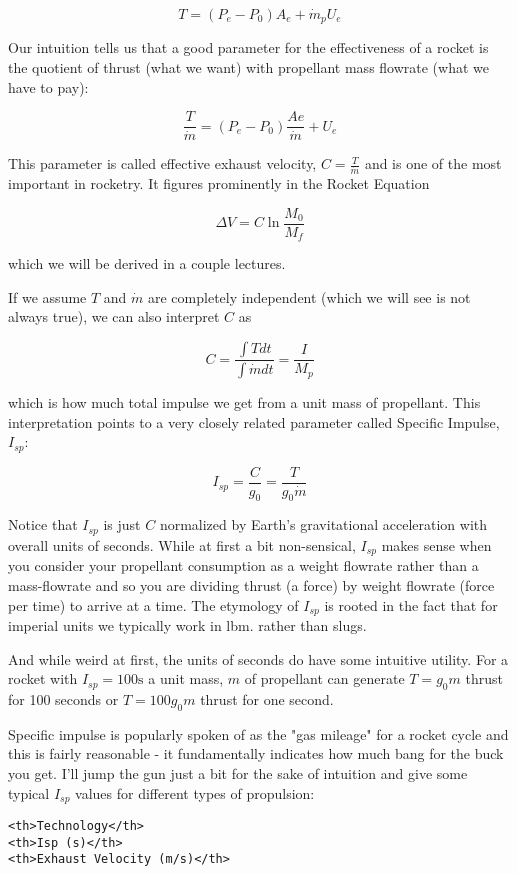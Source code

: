 \documentclass[11pt]{article}
\begin{document}
\[T = (P_e - P_0)A_e + \dot{m}_pU_e\]

Our intuition tells us that a good parameter for the effectiveness of a
rocket is the quotient of thrust (what we want) with propellant mass
flowrate (what we have to pay):

\[\frac{T}{\dot{m}} = (P_e - P_0)\frac{Ae}{\dot{m}} + U_e\]

This parameter is called effective exhaust velocity,
\(C = \frac{T}{\dot{m}}\) and is one of the most important in rocketry.
It figures prominently in the Rocket Equation

\[\Delta V = C \ln \frac{M_0}{M_f}\]

which we will be derived in a couple lectures.

If we assume \(T\) and \(\dot{m}\) are completely independent (which we
will see is not always true), we can also interpret \(C\) as

\[C = \frac{\int T dt}{\int \dot{m} dt} = \frac{I}{M_p}\]

which is how much total impulse we get from a unit mass of propellant.
This interpretation points to a very closely related parameter called
Specific Impulse, \(I_{sp}\):

\[I_{sp} = \frac{C}{g_0} = \frac{T}{g_0\dot{m}}\]

Notice that \(I_{sp}\) is just \(C\) normalized by Earth's gravitational
acceleration with overall units of seconds. While at first a bit
non-sensical, \(I_{sp}\) makes sense when you consider your propellant
consumption as a weight flowrate rather than a mass-flowrate and so you
are dividing thrust (a force) by weight flowrate (force per time) to
arrive at a time. The etymology of \(I_{sp}\) is rooted in the fact that
for imperial units we typically work in lbm. rather than slugs.

And while weird at first, the units of seconds do have some intuitive
utility. For a rocket with \(I_{sp} = 100 \text{s}\) a unit mass, \(m\)
of propellant can generate \(T=g_0 m\) thrust for 100 seconds or
\(T = 100 g_0 m\) thrust for one second.

Specific impulse is popularly spoken of as the "gas mileage" for a
rocket cycle and this is fairly reasonable - it fundamentally indicates
how much bang for the buck you get. I'll jump the gun just a bit for the
sake of intuition and give some typical \(I_{sp}\) values for different
types of propulsion:

\begin{verbatim}
<th>Technology</th>
<th>Isp (s)</th>
<th>Exhaust Velocity (m/s)</th>
\end{verbatim}
\end{document}
